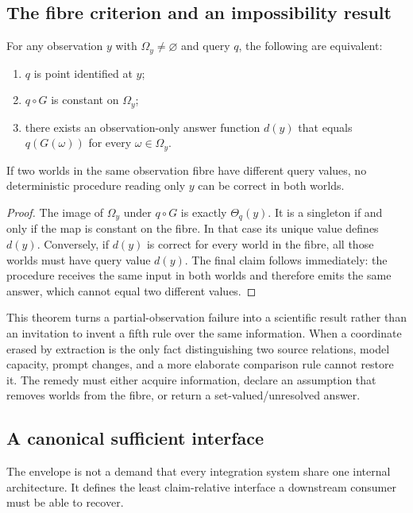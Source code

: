\subsection{The fibre criterion and an impossibility result}

\begin{theorem}
\label{thm:fibre}
For any observation $y$ with $\Omega_y\neq\varnothing$ and query $q$, the
following are equivalent:
\begin{enumerate}
  \item $q$ is point identified at $y$;
  \item $q\circ G$ is constant on $\Omega_y$;
  \item there exists an observation-only answer function $d(y)$ that equals
        $q(G(\omega))$ for every $\omega\in\Omega_y$.
\end{enumerate}
If two worlds in the same observation fibre have different query values, no
deterministic procedure reading only $y$ can be correct in both worlds.
\end{theorem}

\begin{proof}
The image of $\Omega_y$ under $q\circ G$ is exactly $\Theta_q(y)$. It is a
singleton if and only if the map is constant on the fibre. In that case its
unique value defines $d(y)$. Conversely, if $d(y)$ is correct for every world
in the fibre, all those worlds must have query value $d(y)$. The final claim
follows immediately: the procedure receives the same input in both worlds and
therefore emits the same answer, which cannot equal two different values.
\end{proof}

This theorem turns a partial-observation failure into a scientific result
rather than an invitation to invent a fifth rule over the same information.
When a coordinate erased by extraction is the only fact distinguishing two
source relations, model capacity, prompt changes, and a more elaborate
comparison rule cannot restore it. The remedy must either acquire information,
declare an assumption that removes worlds from the fibre, or return a
set-valued/unresolved answer.

\subsection{A canonical sufficient interface}

The envelope is not a demand that every integration system share one internal
architecture. It defines the least claim-relative interface a downstream
consumer must be able to recover.

